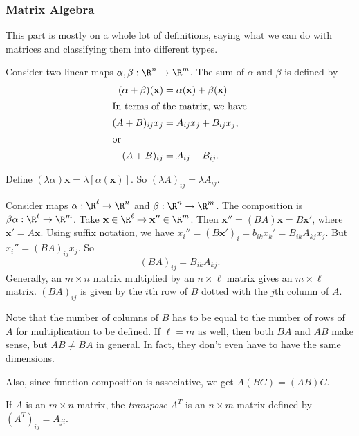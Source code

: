 \documentclass[a4paper]{article}
\begin{document}
\subsubsection{Matrix Algebra}
This part is mostly on a whole lot of definitions, saying what we can do with matrices and classifying them into different types.

\begin{defi} Consider two linear maps $\alpha, \beta: \R^n\to \R^m$. The sum of $\alpha$ and $\beta$ is defined by
  \begin{align*}
    (\alpha + \beta)(\mathbf{x}) &= \alpha(\mathbf{x}) + \beta(\mathbf{x})\\
    \intertext{In terms of the matrix, we have}
    (A + B)_{ij}x_j &= A_{ij}x_j + B_{ij}x_j,\\
    \intertext{or}
    (A + B)_{ij} &= A_{ij}+B_{ij}.
  \end{align*}
\end{defi}

\begin{defi}
  Define $(\lambda\alpha)\mathbf{x} = \lambda[\alpha(\mathbf{x})]$. So $(\lambda A)_{ij} = \lambda A_{ij}$.
\end{defi}

\begin{defi}
  Consider maps $\alpha: \R^\ell \to \R^n$ and $\beta: \R^n\to \R^m$. The composition is $\beta\alpha:\R^\ell\to\R^m$. Take $\mathbf{x}\in \R^\ell\mapsto \mathbf{x}''\in \R^m$. Then $\mathbf{x}'' = (BA)\mathbf{x} = B\mathbf{x'}$, where $\mathbf{x}' = A\mathbf{x}$. Using suffix notation, we have $x_i'' = (B\mathbf{x}')_i = b_{ik}x_k' = B_{ik}A_{kj}x_j$. But $x_i'' = (BA)_{ij}x_j$. So
  \[
    (BA)_{ij} = B_{ik}A_{kj}.
  \]
  Generally, an $m\times n$ matrix multiplied by an $n\times \ell$ matrix gives an $m\times\ell$ matrix. $(BA)_{ij}$ is given by the $i$th row of $B$ dotted with the $j$th column of $A$.
\end{defi}
Note that the number of columns of $B$ has to be equal to the number of rows of $A$ for multiplication to be defined. If $\ell = m$ as well, then both $BA$ and $AB$ make sense, but $AB\not= BA$ in general. In fact, they don't even have to have the same dimensions.

Also, since function composition is associative, we get $A(BC) = (AB)C$.

\begin{defi}
  If $A$ is an $m\times n$ matrix, the \emph{transpose} $A^T$ is an $n\times m$ matrix defined by $(A^T)_{ij} = A_{ji}$.
\end{defi}
\end{document}
